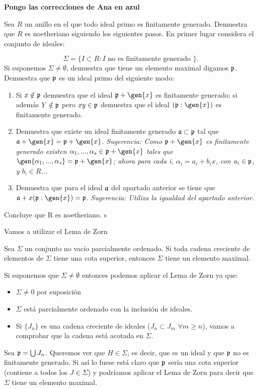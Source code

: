\noindent {}
	
	\textbf{Pongo las correcciones de Ana en azul}

\begin{problem}[1]
	Sea $R$ un anillo en el que todo ideal primo es finitamente generado. Demuestra que $R$ es noetheriano siguiendo los siguientes pasos. En primer lugar considera el conjunto de ideales:

	$$\Sigma = \{ I \subset R: I \text{ no es finitamente generado } \}.$$
	\ppart Si suponemos $\Sigma \neq \emptyset$, demuestra que tiene un elemento maximal digamos $\mathfrak{p}$.
	\ppart Demuestra que $\mathfrak{p}$ es un ideal primo del siguiente modo:
		\begin{enumerate}
			\item Si $x \notin \mathfrak{p}$ demuestra que el ideal $\pideal+\gen{x}$ es finitamente generado; si además $Y \notin \mathfrak{p}$ pero $xy \in \mathfrak{p}$ demuestra que el ideal $(\pideal: \gen{x})$ es finitamente generado.
			\item Demuestra que existe un ideal finitamente generado $\mathfrak{a} \subset \mathfrak{p}$ tal que $\aideal + \gen{x}=\pideal + \gen{x}$. \textit{Sugerencia: Como $\pideal+\gen{x}$ es finitamente generado existen $\alpha_1,...,\alpha_s \in \pideal + \gen{x}$ tales que $\gen{\alpha_1,...,\alpha_s}=\pideal + \gen{x}$; ahora para cada i, $\alpha_i=a_i+b_ix$, con $a_i \in \mathfrak{p}$, y $b_i \in R$...}
			\item Demuestra que para el ideal $\mathfrak{a}$ del apartado anterior se tiene que $\aideal+x(\pideal:\gen{x})=\pideal$. \textit{Sugerencia: Utiliza la igualdad del apartado
			anterior.}
		\end{enumerate}
	\ppart Concluye que R es noetheriano.
s
	\solution

	\spart

	Vamos a utilizar el Lema de Zorn
	\begin{lemma}
		Sea $\Sigma$ un conjunto no vacío parcialmente ordenado. Si toda cadena creciente de elementos de $\Sigma$ tiene una cota superior, entonces $\Sigma$ tiene un elemento maximal.
	\end{lemma}

	Si suponemos que $\Sigma \neq \emptyset$ entonces podemos aplicar el Lema de Zorn ya que:
	\begin{itemize}
		\item $\Sigma \neq 0$ por suposición
		\item $\Sigma$ está parcialmente ordenado con la inclusión de ideales.
		\item Si $\{ J_n\}$ es una cadena creciente de ideales ($J_n \subset J_m$ $\forall m\geq n$), vamos a comprobar que la cadena está acotada en $\Sigma$.
	\end{itemize}
	Sea $\mathfrak{p} = \bigcup J_n$. Queremos ver que $H \in \Sigma$, es decir, que es un ideal y que $\mathfrak{p}$ no es finitamente generado.
	Si así lo fuese está claro que $\mathfrak{p}$ sería una cota superior (contiene a todos los $J \in \Sigma$) y podríamos aplicar el Lema de Zorn para decir que $\Sigma$ tiene un elemento maximal.


\end{problem}
